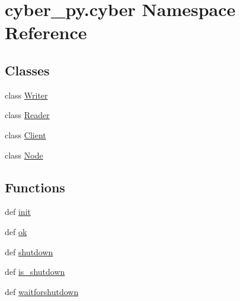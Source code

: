 \hypertarget{namespacecyber__py_1_1cyber}{\section{cyber\-\_\-py.\-cyber Namespace Reference}
\label{namespacecyber__py_1_1cyber}
}
\subsection*{Classes}
\begin{DoxyCompactItemize}
\item 
class \hyperlink{classcyber__py_1_1cyber_1_1Writer}{Writer}
\item 
class \hyperlink{classcyber__py_1_1cyber_1_1Reader}{Reader}
\item 
class \hyperlink{classcyber__py_1_1cyber_1_1Client}{Client}
\item 
class \hyperlink{classcyber__py_1_1cyber_1_1Node}{Node}
\end{DoxyCompactItemize}
\subsection*{Functions}
\begin{DoxyCompactItemize}
\item 
def \hyperlink{namespacecyber__py_1_1cyber_ac5dda5ce1579255672ccd20e200eef6e}{init}
\item 
def \hyperlink{namespacecyber__py_1_1cyber_aacd6b88be138f317081a3270aac80eb4}{ok}
\item 
def \hyperlink{namespacecyber__py_1_1cyber_a7977093d48defe12009683277367d2f6}{shutdown}
\item 
def \hyperlink{namespacecyber__py_1_1cyber_ab17bb5a61b146ffd5050f4bc28370bea}{is\-\_\-shutdown}
\item 
def \hyperlink{namespacecyber__py_1_1cyber_a017bbe6726341a06f0ae2b9cea0918c3}{waitforshutdown}
\end{DoxyCompactItemize}
